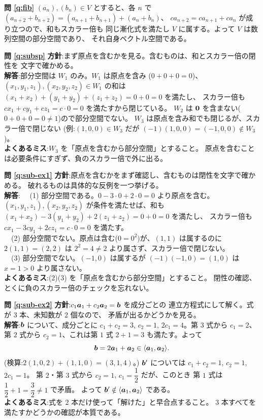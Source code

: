 \bigskip
\noindent\textbf{問 \ref{q:fib}}\quad
$(a_n), (b_n) \in V$ とすると、各 $n$ で
$(a_{n+2} + b_{n+2}) = (a_{n+1} + b_{n+1}) + (a_n + b_n)$、
$ca_{n+2} = ca_{n+1} + ca_n$ が成り立つので、和もスカラー倍も
同じ漸化式を満たし $V$ に属する。よって $V$ は数列空間の部分空間であり、
それ自身ベクトル空間である。

\bigskip
\noindent\textbf{問 \ref{q:subsp}}\quad
\textbf{方針}:まず原点を含むかを見る。含むものは、和とスカラー倍の閉性を
文字で確かめる。\\
\textbf{解答}:部分空間は $W_1$ のみ。$W_1$ は原点を含み
($0+0+0=0$)、$(x_1, y_1, z_1), (x_2, y_2, z_2) \in W_1$ の和は
$(x_1 + x_2) + (y_1 + y_2) + (z_1 + z_2) = 0 + 0 = 0$ を満たし、
スカラー倍も $cx_1 + cy_1 + cz_1 = c \cdot 0 = 0$ を満たすから閉じている。
$W_2$ は $\bm{0}$ を含まない($0 + 0 + 0 = 0 \neq 1$)ので部分空間でない。
$W_3$ は原点を含み和でも閉じるが、スカラー倍で閉じない
(例:$(1,0,0) \in W_3$ だが $(-1)(1,0,0) = (-1,0,0) \notin W_3$)。\\
\textbf{よくあるミス}:$W_3$ を「原点を含むから部分空間」とすること。
原点を含むことは必要条件にすぎず、負のスカラー倍で外に出る。

\bigskip
\noindent\textbf{問 \ref{q:sub-ex1}}\quad
\textbf{方針}:原点を含むかをまず確認し、含むものは閉性を文字で確かめる。
破れるものは具体的な反例を一つ挙げる。\\
\textbf{解答}:
　(1) 部分空間である。$0 - 3 \cdot 0 + 2 \cdot 0 = 0$ より原点を含む。
$(x_1, y_1, z_1), (x_2, y_2, z_2)$ が条件を満たせば、和も
$(x_1 + x_2) - 3(y_1 + y_2) + 2(z_1 + z_2) = 0 + 0 = 0$ を満たし、
スカラー倍も $cx_1 - 3cy_1 + 2cz_1 = c \cdot 0 = 0$ を満たす。\\
　(2) 部分空間でない。原点は含む($0 = 0^2$)が、$(1, 1)$ は属するのに
$2(1,1) = (2, 2)$ は $2^2 = 4 \neq 2$ より属さず、スカラー倍で閉じない。\\
　(3) 部分空間でない。$(-1, 0)$ は属するが
$(-1)(-1, 0) = (1, 0)$ は $x = 1 > 0$ より属さない。\\
\textbf{よくあるミス}:(2)(3) を「原点を含むから部分空間」とすること。
閉性の確認、とくに負のスカラー倍のチェックを忘れない。

\bigskip
\noindent\textbf{問 \ref{q:sub-ex2}}\quad
\textbf{方針}:$c_1\bm{a}_1 + c_2\bm{a}_2 = \bm{b}$ を成分ごとの
連立方程式にして解く。式が $3$ 本、未知数が $2$ 個なので、
矛盾が出るかどうかを見る。\\
\textbf{解答}:$\bm{b}$ について、成分ごとに
$c_1 + c_2 = 3$, $c_2 = 1$, $2c_1 = 4$。第 $3$ 式から $c_1 = 2$、
第 $2$ 式から $c_2 = 1$、これは第 $1$ 式 $2 + 1 = 3$ も満たす。よって
\[
\bm{b} = 2\bm{a}_1 + \bm{a}_2 \in \langle \bm{a}_1, \bm{a}_2 \rangle.
\]
(検算:$2(1,0,2) + (1,1,0) = (3,1,4)$。)
$\bm{b}'$ については $c_1 + c_2 = 1$, $c_2 = 1$, $2c_1 = 1$。
第 $2$・第 $3$ 式から $c_2 = 1$, $c_1 = \dfrac{1}{2}$ だが、このとき
第 $1$ 式は $\dfrac{1}{2} + 1 = \dfrac{3}{2} \neq 1$ で矛盾。
よって $\bm{b}' \notin \langle \bm{a}_1, \bm{a}_2 \rangle$ である。\\
\textbf{よくあるミス}:式を $2$ 本だけ使って「解けた」と早合点すること。
$3$ 本すべてを満たすかどうかの確認が本質である。

